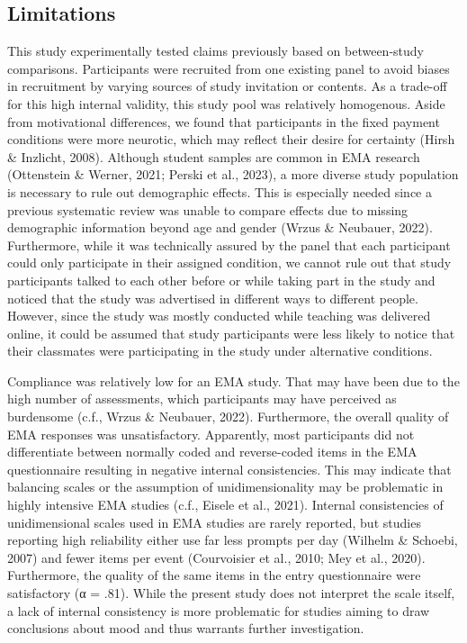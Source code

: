 \documentclass[authordate, empirical]{jote-new-article}
\begin{document}
	\subsection{Limitations}



	This study experimentally tested claims previously based on between-study comparisons. Participants were recruited from one existing panel to avoid biases in recruitment by varying sources of study invitation or contents. As a trade-off for this high internal validity, this study pool was relatively homogenous. Aside from motivational differences, we found that participants in the fixed payment conditions were more neurotic, which may reflect their desire for certainty (Hirsh \& Inzlicht, 2008). Although student samples are common in EMA research (Ottenstein \& Werner, 2021; Perski et al., 2023), a more diverse study population is necessary to rule out demographic effects. This is especially needed since a previous systematic review was unable to compare effects due to missing demographic information beyond age and gender (Wrzus \& Neubauer, 2022). Furthermore, while it was technically assured by the panel that each participant could only participate in their assigned condition, we cannot rule out that study participants talked to each other before or while taking part in the study and noticed that the study was advertised in different ways to different people. However, since the study was mostly conducted while teaching was delivered online, it could be assumed that study participants were less likely to notice that their classmates were participating in the study under alternative conditions.



	Compliance was relatively low for an EMA study. That may have been due to the high number of assessments, which participants may have perceived as burdensome (c.f., Wrzus \& Neubauer, 2022). Furthermore, the overall quality of EMA responses was unsatisfactory. Apparently, most participants did not differentiate between normally coded and reverse-coded items in the EMA questionnaire resulting in negative internal consistencies. This may indicate that balancing scales or the assumption of unidimensionality may be problematic in highly intensive EMA studies (c.f., Eisele et al., 2021). Internal consistencies of unidimensional scales used in EMA studies are rarely reported, but studies reporting high reliability either use far less prompts per day (Wilhelm \& Schoebi, 2007) and fewer items per event (Courvoisier et al., 2010; Mey et al., 2020). Furthermore, the quality of the same items in the entry questionnaire were satisfactory (α = .81). While the present study does not interpret the scale itself, a lack of internal consistency is more problematic for studies aiming to draw conclusions about mood and thus warrants further investigation.
\end{document}
